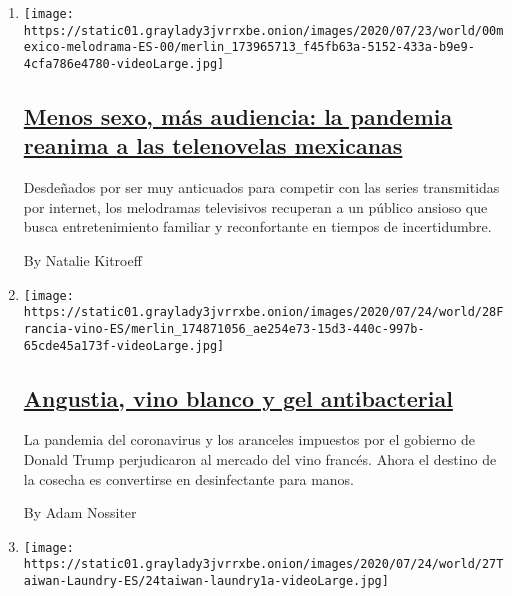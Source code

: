 \begin{enumerate}
\def\labelenumi{\arabic{enumi}.}
\item
  \texttt{[image: https://static01.graylady3jvrrxbe.onion/images/2020/07/23/world/00mexico-melodrama-ES-00/merlin\_173965713\_f45fb63a-5152-433a-b9e9-4cfa786e4780-videoLarge.jpg]}

  \hypertarget{menos-sexo-muxe1s-audiencia-la-pandemia-reanima-a-las-telenovelas-mexicanas}{%
  \subsection{\texorpdfstring{\href{/es/2020/08/02/espanol/america-latina/televisa-rosa-de-guadalupe-netflix.html}{Menos
  sexo, más audiencia: la pandemia reanima a las telenovelas
  mexicanas}}{Menos sexo, más audiencia: la pandemia reanima a las telenovelas mexicanas}}\label{menos-sexo-muxe1s-audiencia-la-pandemia-reanima-a-las-telenovelas-mexicanas}}

  Desdeñados por ser muy anticuados para competir con las series
  transmitidas por internet, los melodramas televisivos recuperan a un
  público ansioso que busca entretenimiento familiar y reconfortante en
  tiempos de incertidumbre.

  By Natalie Kitroeff
\item
  \texttt{[image: https://static01.graylady3jvrrxbe.onion/images/2020/07/24/world/28Francia-vino-ES/merlin\_174871056\_ae254e73-15d3-440c-997b-65cde45a173f-videoLarge.jpg]}

  \hypertarget{angustia-vino-blanco-y-gel-antibacterial}{%
  \subsection{\texorpdfstring{\href{/es/2020/07/28/espanol/mundo/vino-blanco-alsacia-coronavirus.html}{Angustia,
  vino blanco y gel
  antibacterial}}{Angustia, vino blanco y gel antibacterial}}\label{angustia-vino-blanco-y-gel-antibacterial}}

  La pandemia del coronavirus y los aranceles impuestos por el gobierno
  de Donald Trump perjudicaron al mercado del vino francés. Ahora el
  destino de la cosecha es convertirse en desinfectante para manos.

  By Adam Nossiter
\item
  \texttt{[image: https://static01.graylady3jvrrxbe.onion/images/2020/07/24/world/27Taiwan-Laundry-ES/24taiwan-laundry1a-videoLarge.jpg]}

  \hypertarget{uxe9l-tiene-83-ella-84-y-modelan-la-ropa-que-la-gente-olvida-en-su-lavanderuxeda}{%
}
\end{enumerate}
